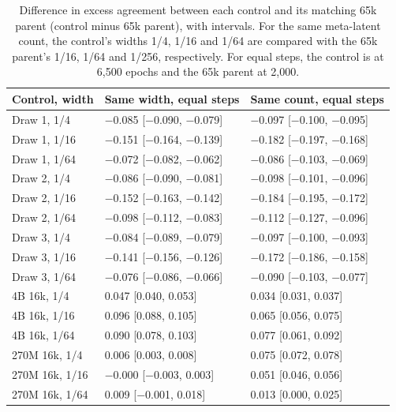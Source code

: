 \begin{table}[!ht]
  \caption{Difference in excess agreement between each control and its matching 65k parent (control minus 65k parent), with intervals. For the same meta-latent count, the control's widths 1/4, 1/16 and 1/64 are compared with the 65k parent's 1/16, 1/64 and 1/256, respectively. For equal steps, the control is at 6,500 epochs and the 65k parent at 2,000.}
  \label{tab:app-arm-diff}
  \centering
  \small
  \begin{tabular}{@{}l*{2}{@{\hspace{6pt}}l}@{}}
    \toprule
    Control, width & Same width, equal steps & Same count, equal steps \\
    \midrule
    Draw 1, 1/4 & $-$0.085 [$-$0.090, $-$0.079] & $-$0.097 [$-$0.100, $-$0.095] \\
    Draw 1, 1/16 & $-$0.151 [$-$0.164, $-$0.139] & $-$0.182 [$-$0.197, $-$0.168] \\
    Draw 1, 1/64 & $-$0.072 [$-$0.082, $-$0.062] & $-$0.086 [$-$0.103, $-$0.069] \\
    Draw 2, 1/4 & $-$0.086 [$-$0.090, $-$0.081] & $-$0.098 [$-$0.101, $-$0.096] \\
    Draw 2, 1/16 & $-$0.152 [$-$0.163, $-$0.142] & $-$0.184 [$-$0.195, $-$0.172] \\
    Draw 2, 1/64 & $-$0.098 [$-$0.112, $-$0.083] & $-$0.112 [$-$0.127, $-$0.096] \\
    Draw 3, 1/4 & $-$0.084 [$-$0.089, $-$0.079] & $-$0.097 [$-$0.100, $-$0.093] \\
    Draw 3, 1/16 & $-$0.141 [$-$0.156, $-$0.126] & $-$0.172 [$-$0.186, $-$0.158] \\
    Draw 3, 1/64 & $-$0.076 [$-$0.086, $-$0.066] & $-$0.090 [$-$0.103, $-$0.077] \\
    4B 16k, 1/4 & 0.047 [0.040, 0.053] & 0.034 [0.031, 0.037] \\
    4B 16k, 1/16 & 0.096 [0.088, 0.105] & 0.065 [0.056, 0.075] \\
    4B 16k, 1/64 & 0.090 [0.078, 0.103] & 0.077 [0.061, 0.092] \\
    270M 16k, 1/4 & 0.006 [0.003, 0.008] & 0.075 [0.072, 0.078] \\
    270M 16k, 1/16 & $-$0.000 [$-$0.003, 0.003] & 0.051 [0.046, 0.056] \\
    270M 16k, 1/64 & 0.009 [$-$0.001, 0.018] & 0.013 [0.000, 0.025] \\
    \bottomrule
  \end{tabular}
\end{table}

